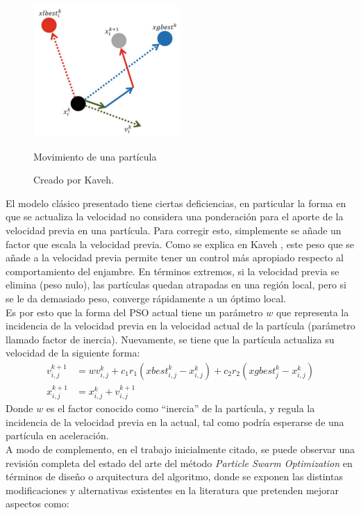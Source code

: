 \begin{figure}[h!]
    \centering    
    \includegraphics[height=50mm]{figures/move_particle.png} 
    \caption{Movimiento de una partícula}
    \vspace{-.25cm} 
    \caption*{Creado por Kaveh\cite{Psoexplain14}.}
    \label{fig:move_part}
\end{figure}
El modelo clásico presentado tiene ciertas deficiencias, en particular la forma en que se actualiza la velocidad no considera una ponderación para el aporte de la velocidad previa en una partícula. Para corregir esto, simplemente se añade un factor que escala la velocidad previa. Como se explica en Kaveh \cite{Psoexplain14}, este peso que se añade a la velocidad previa permite tener un control más apropiado respecto al comportamiento del enjambre. En términos extremos, si la velocidad previa se elimina (peso nulo), las partículas quedan atrapadas en una región local, pero si se le da demasiado peso, converge rápidamente a un óptimo local.\\
Es por esto que la forma del PSO actual tiene un parámetro $w$ que representa la incidencia de la velocidad previa en la velocidad actual de la partícula (parámetro llamado factor de inercia). Nuevamente, se tiene que la partícula actualiza su velocidad de la siguiente forma: 
\begin{align}\label{eq:PSO}
    v_{i,j}^{k+1} &= wv_{i,j}^{k} + c_{1}r_{1}(xbest_{i,j}^k - x_{i,j}^k) + c_{2}r_{2}(xgbest_{j}^{k} - x_{i,j}^k)\\
    x_{i,j}^{k+1} &= x_{i,j}^{k} + v_{i,j}^{k+1}
\end{align}    
Donde $w$ es el factor conocido como ``inercia'' de la partícula, y regula la incidencia de la velocidad previa en la actual, tal como podría esperarse de una partícula en aceleración.\\
A modo de complemento, en el trabajo inicialmente citado, se puede observar una revisión completa del estado del arte del método \emph{Particle Swarm Optimization} en términos de diseño o arquitectura del algoritmo, donde se exponen las distintas modificaciones y alternativas existentes en la literatura que pretenden mejorar aspectos como:
